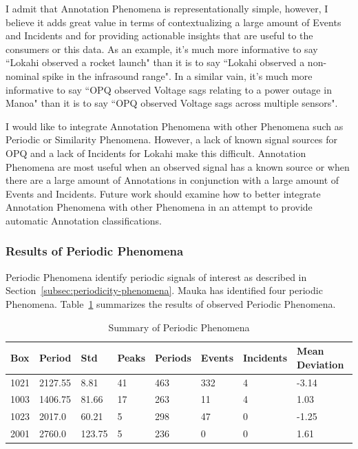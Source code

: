 I admit that Annotation Phenomena is representationally simple, however, I believe it adds great value in terms of contextualizing a large amount of Events and Incidents and for providing actionable insights that are useful to the consumers or this data. As an example, it's much more informative to say ``Lokahi observed a rocket launch" than it is to say ``Lokahi observed a non-nominal spike in the infrasound range". In a similar vain, it's much more informative to say ``OPQ observed Voltage sags relating to a power outage in Manoa" than it is to say ``OPQ observed Voltage sags across multiple sensors".

I would like to integrate Annotation Phenomena with other Phenomena such as Periodic or Similarity Phenomena. However, a lack of known signal sources for OPQ and a lack of Incidents for Lokahi make this difficult. Annotation Phenomena are most useful when an observed signal has a known source or when there are a large amount of Annotations in conjunction with a large amount of Events and Incidents. Future work should examine how to better integrate Annotation Phenomena with other Phenomena in an attempt to provide automatic Annotation classifications.

\subsubsection{Results of Periodic Phenomena}

Periodic Phenomena identify periodic signals of interest as described in Section~\ref{subsec:periodicity-phenomena}. Mauka has identified four periodic Phenomena. Table~\ref{table:periodic_summary} summarizes the results of observed Periodic Phenomena.

\begin{table}[H]
    \centering
    \caption{Summary of Periodic Phenomena}
    \begin{tabularx}{\textwidth}{Xlllllll}
        \toprule
        \textbf{Box} & \textbf{Period} & \textbf{Std} & \textbf{Peaks} & \textbf{Periods} & \textbf{Events} & \textbf{Incidents} & \textbf{Mean Deviation} \\
        \midrule
        1021 & 2127.55 & 8.81 & 41 & 463 & 332 & 4 & -3.14 \\
        1003 & 1406.75 & 81.66 & 17 & 263 & 11 & 4 & 1.03 \\
        1023 & 2017.0 & 60.21 & 5 & 298 & 47 & 0 & -1.25 \\
        2001 & 2760.0 & 123.75 & 5 & 236 & 0 & 0 & 1.61 \\
        \bottomrule
    \end{tabularx}
    \label{table:periodic_summary}
\end{table}

